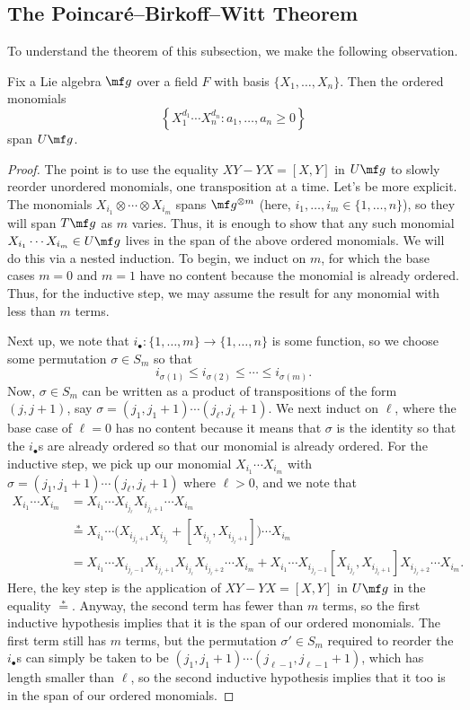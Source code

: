 \documentclass[../notes.tex]{subfiles}
\begin{document}
\subsection{The Poincar\'e--Birkoff--Witt Theorem}
To understand the theorem of this subsection, we make the following observation.
\begin{lemma} \label{lem:pbw-span}
	Fix a Lie algebra $\mf g$ over a field $F$ with basis $\{X_1,\ldots,X_n\}$. Then the ordered monomials
	\[\left\{X_1^{d_1}\cdots X_n^{d_n}:a_1,\ldots,a_n\ge0\right\}\]
	span $U\mf g$.
\end{lemma}
\begin{proof}
	The point is to use the equality $XY-YX=[X,Y]$ in $U\mf g$ to slowly reorder unordered monomials, one transposition at a time. Let's be more explicit. The monomials $X_{i_1}\otimes\cdots\otimes X_{i_m}$ spans $\mf g^{\otimes m}$ (here, $i_1,\ldots,i_m\in\{1,\ldots,n\}$), so they will span $T\mf g$ as $m$ varies. Thus, it is enough to show that any such monomial $X_{i_1}\cdots X_{i_m}\in U\mf g$ lives in the span of the above ordered monomials. We will do this via a nested induction. To begin, we induct on $m$, for which the base cases $m=0$ and $m=1$ have no content because the monomial is already ordered. Thus, for the inductive step, we may assume the result for any monomial with less than $m$ terms.
	
	Next up, we note that $i_\bullet\colon\{1,\ldots,m\}\to\{1,\ldots,n\}$ is some function, so we choose some permutation $\sigma\in S_m$ so that
	\[i_{\sigma(1)}\le i_{\sigma(2)}\le\cdots\le i_{\sigma(m)}.\]
	Now, $\sigma\in S_m$ can be written as a product of transpositions of the form $(j,j+1)$, say $\sigma=(j_1,j_1+1)\cdots(j_\ell,j_\ell+1)$. We next induct on $\ell$, where the base case of $\ell=0$ has no content because it means that $\sigma$ is the identity so that the $i_\bullet$s are already ordered so that our monomial is already ordered. For the inductive step, we pick up our monomial $X_{i_1}\cdots X_{i_m}$ with $\sigma=(j_1,j_1+1)\cdots(j_\ell,j_\ell+1)$ where $\ell>0$, and we note that
	\begin{align*}
		X_{i_1}\cdots X_{i_m} &= X_{i_1}\cdots X_{i_{j_\ell}}X_{i_{j_\ell+1}}\cdots X_{i_m} \\
		&\stackrel*= X_{i_1}\cdots\big(X_{i_{j_\ell+1}}X_{i_{j_\ell}}+[X_{i_{j_\ell}},X_{i_{j_\ell+1}}]\big)\cdots X_{i_m} \\
		&= X_{i_1}\cdots X_{i_{j_\ell-1}}X_{i_{j_\ell+1}}X_{i_{j_\ell}}X_{i_{j_\ell+2}}\cdots X_{i_m}+X_{i_1}\cdots X_{i_{j_\ell-1}}[X_{i_{j_\ell}},X_{i_{j_\ell+1}}]X_{i_{j_\ell+2}}\cdots X_{i_m}.
	\end{align*}
	Here, the key step is the application of $XY-YX=[X,Y]$ in $U\mf g$ in the equality $\stackrel*=$. Anyway, the second term has fewer than $m$ terms, so the first inductive hypothesis implies that it is the span of our ordered monomials. The first term still has $m$ terms, but the permutation $\sigma'\in S_m$ required to reorder the $i_\bullet$s can simply be taken to be $(j_1,j_1+1)\cdots(j_{\ell-1},j_{\ell-1}+1)$, which has length smaller than $\ell$, so the second inductive hypothesis implies that it too is in the span of our ordered monomials.
\end{proof}
\end{document}
